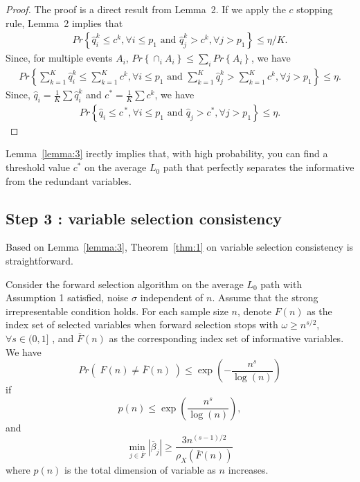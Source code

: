 \documentclass[11pt,review,authoryear]{elsarticle}
\begin{document}
\begin{appendices}
\begin{proof}
    The proof is a direct result from Lemma~2. If we apply the $c$ stopping rule, Lemma~2 implies that
    \begin{eqnarray}
        Pr\left\{ \widehat{q}_i^k \leqslant c^k,\forall i\leqslant p_1 \mbox{ and } \widehat{q}_j^k > c^k,\forall j>p_1 \right\} \leqslant \eta/K.
    \end{eqnarray}
    Since, for multiple events $A_i$, $Pr\left\{ \cap_i A_i\right\} \leqslant \sum_i Pr\left\{ A_i\right\}$, we have
    \begin{eqnarray}
        Pr\left\{ \sum_{k=1}^K \widehat{q}_i^k \leqslant \sum_{k=1}^K c^k,\forall i\leqslant p_1 \mbox{ and } \sum_{k=1}^K  \widehat{q}_j^k > \sum_{k=1}^K c^k,\forall j>p_1 \right\} \leqslant \eta.
    \end{eqnarray}
    Since, $\widehat{q}_i = \frac{1}{K}\sum\widehat{q}_{i}^{k}$ and $c^{*} = \frac{1}{K}\sum c^k$, we have
    \begin{eqnarray}
        Pr\left\{ \widehat{q}_i \leqslant c^{\,*},\forall i \leqslant p_1 \mbox{ and } \widehat{q}_j > c^{*},\forall j>p_1 \right\} \leqslant \eta.
    \end{eqnarray}
\end{proof}
\noindent
Lemma~\ref{lemma:3} irectly implies that, with high probability, you can find a threshold value $c^*$ on the average $L_0$ path that perfectly separates the informative from the redundant variables.


\subsection*{Step 3 : variable selection consistency}

Based on Lemma~\ref{lemma:3}, Theorem~\ref{thm:1} on variable selection consistency is straightforward.

\begin{theorem}
  Consider the forward selection algorithm on the average $L_0$ path with Assumption 1 satisfied, noise $\sigma$ independent of $n$. Assume that the strong irrepresentable condition holds. For each sample size $n$, denote $F\left( n \right)$ as the index set of selected variables when forward selection stops with $\omega\geqslant n^{s/2}$, $\forall s\in(0,1]$ , and $\overline{F}\left(n\right)$ as the corresponding index set of informative variables. We have
  \[
      Pr\left(\;F\left(n\right)\neq\overline{F}\left(n\right)\;\right)\leqslant \exp\left(-\frac{n^{s}}{\log\left(n\right)}\right)
  \]
  if
  \[
      p\left(n\right)\leqslant\exp\left(\frac{n^{s}}{\log\left(n\right)}\right),
  \]
  and
  \[
      \min_{j\in\overline{F}}\left|\overline{\beta}_{j}\right|\geqslant\frac{3n^{(s-1)/2}}{\rho_{X}\left(\overline{F}\left(n\right)\right)}
  \]
  where $p\left(n\right)$ is the total dimension of variable as $n$ increases.
  \label{thm:1}
\end{theorem}


\end{appendices}
\end{document}
